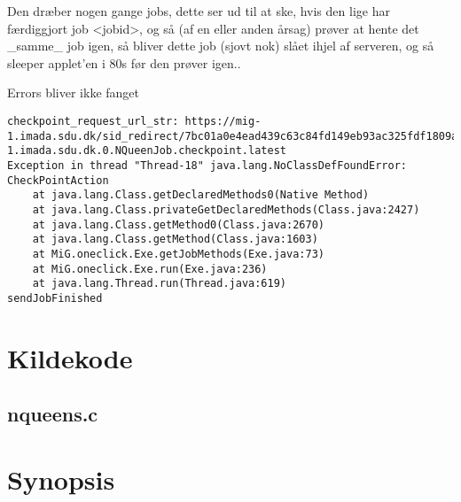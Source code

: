 \documentclass[draft,a4paper,10pt]{article}
\begin{document}
Den dræber nogen gange jobs, dette ser ud til at ske, hvis den lige har
færdiggjort job <jobid>, og så (af en eller anden årsag) prøver at hente det
\_samme\_ job igen, så bliver dette job (sjovt nok) slået ihjel af serveren, og
så sleeper applet'en i 80s før den prøver igen.. 

Errors bliver ikke fanget
\begin{verbatim}
checkpoint_request_url_str: https://mig-1.imada.sdu.dk/sid_redirect/7bc01a0e4ead439c63c84fd149eb93ac325fdf1809aedc23049c010890bf14bd/13768_6_2_2007__8_42_57_mig-1.imada.sdu.dk.0.NQueenJob.checkpoint.latest
Exception in thread "Thread-18" java.lang.NoClassDefFoundError: CheckPointAction
	at java.lang.Class.getDeclaredMethods0(Native Method)
	at java.lang.Class.privateGetDeclaredMethods(Class.java:2427)
	at java.lang.Class.getMethod0(Class.java:2670)
	at java.lang.Class.getMethod(Class.java:1603)
	at MiG.oneclick.Exe.getJobMethods(Exe.java:73)
	at MiG.oneclick.Exe.run(Exe.java:236)
	at java.lang.Thread.run(Thread.java:619)
sendJobFinished
\end{verbatim}

%




\appendix


\section{Kildekode}
\subsection{nqueens.c}\label{ckode}
%

\section{Synopsis}
%


%
%
\end{document}
